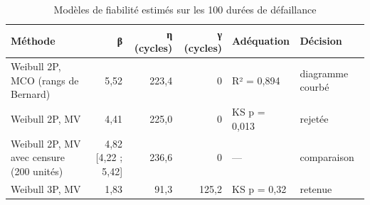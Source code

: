 \begin{table}[htbp]
\centering
\caption{Modèles de fiabilité estimés sur les 100 durées de défaillance}
\label{tab:fiabilite_modeles}
\begin{tabular}{lrrrll}
\toprule
Méthode & β & η (cycles) & γ (cycles) & Adéquation & Décision \\
\midrule
Weibull 2P, MCO (rangs de Bernard) & 5,52 & 223,4 & 0 & R² = 0,894 & diagramme courbé \\
Weibull 2P, MV & 4,41 & 225,0 & 0 & KS p = 0,013 & rejetée \\
Weibull 2P, MV avec censure (200 unités) & 4,82 [4,22 ; 5,42] & 236,6 & 0 & — & comparaison \\
Weibull 3P, MV & 1,83 & 91,3 & 125,2 & KS p = 0,32 & retenue \\
\bottomrule
\end{tabular}
\end{table}
